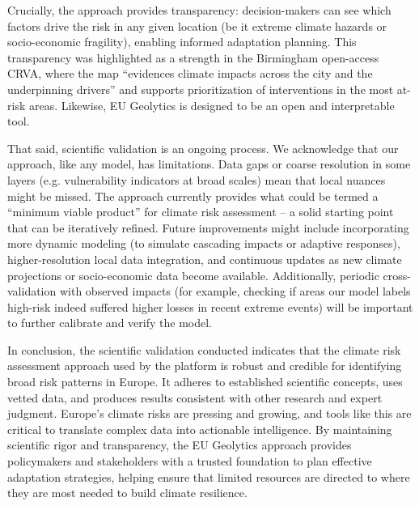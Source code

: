 \documentclass[10pt, conference]{IEEEtran}
\begin{document}
Crucially, the approach provides transparency: decision-makers can see which factors drive the risk in any given location (be it extreme climate hazards or socio-economic fragility), enabling informed adaptation planning. This transparency was highlighted as a strength in the Birmingham open-access CRVA, where the map “evidences climate impacts across the city and the underpinning drivers” and supports prioritization of interventions in the most at-risk areas. Likewise, EU Geolytics is designed to be an open and interpretable tool.

That said, scientific validation is an ongoing process. We acknowledge that our approach, like any model, has limitations. Data gaps or coarse resolution in some layers (e.g. vulnerability indicators at broad scales) mean that local nuances might be missed. The approach currently provides what could be termed a “minimum viable product” for climate risk assessment – a solid starting point that can be iteratively refined. Future improvements might include incorporating more dynamic modeling (to simulate cascading impacts or adaptive responses), higher-resolution local data integration, and continuous updates as new climate projections or socio-economic data become available. Additionally, periodic cross-validation with observed impacts (for example, checking if areas our model labels high-risk indeed suffered higher losses in recent extreme events) will be important to further calibrate and verify the model.

In conclusion, the scientific validation conducted indicates that the climate risk assessment approach used by the platform is robust and credible for identifying broad risk patterns in Europe. It adheres to established scientific concepts, uses vetted data, and produces results consistent with other research and expert judgment. Europe’s climate risks are pressing and growing, and tools like this are critical to translate complex data into actionable intelligence. By maintaining scientific rigor and transparency, the EU Geolytics approach provides policymakers and stakeholders with a trusted foundation to plan effective adaptation strategies, helping ensure that limited resources are directed to where they are most needed to build climate resilience.
\end{document}
